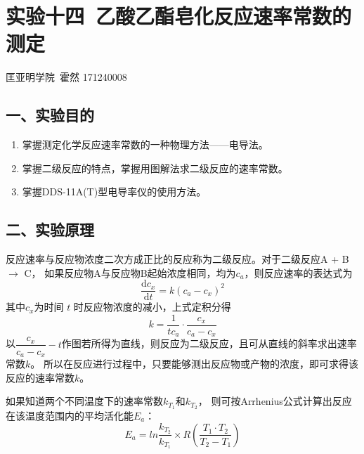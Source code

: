 \documentclass[a4paper]{ctexart}
\begin{document}
\section*{实验十四\ 乙酸乙酯皂化反应速率常数的测定}


	\begin{center}
	匡亚明学院\ 霍然 171240008
	\end{center}


	\subsection*{一、实验目的}
		\begin{enumerate}
			\item 掌握测定化学反应速率常数的一种物理方法——电导法。
			\item 掌握二级反应的特点，掌握用图解法求二级反应的速率常数。
			\item 掌握DDS-11A(T)型电导率仪的使用方法。
		\end{enumerate}
		
		
	\subsection*{二、实验原理}
		反应速率与反应物浓度二次方成正比的反应称为二级反应。对于二级反应A + B $\longrightarrow$ C，
		如果反应物A与反应物B起始浓度相同，均为$c_a$，则反应速率的表达式为
		\begin{equation}
			\frac{\mathrm{d}c_x}{\mathrm{d}t}=k\left(c_a-c_x\right)^2
		\end{equation}
		其中$c_x$为时间 $t$ 时反应物浓度的减小，上式定积分得
		\begin{equation}
			k=\frac{1}{tc_a}\cdot\frac{c_x}{c_a-c_x}
		\end{equation}
		以$\dfrac{c_x}{c_a-c_x}-t$作图若所得为直线，则反应为二级反应，且可从直线的斜率求出速率常数$k$。
		所以在反应进行过程中，只要能够测出反应物或产物的浓度，即可求得该反应的速率常数$k$。
		
		如果知道两个不同温度下的速率常数$k_{T_1}$和$k_{T_2}$，
		则可按Arrhenius公式计算出反应在该温度范围内的平均活化能$E_a$：
		\begin{equation}
			E_a=ln\frac{k_{T_2}}{k_{T_1}}\times R\left(\frac{T_1\cdot T_2}{T_2-T_1}\right)
		\end{equation}
		
\end{document}
